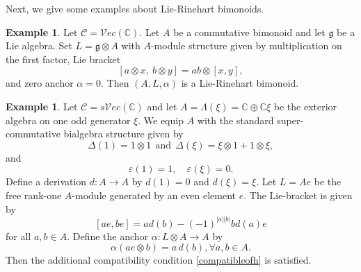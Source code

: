 \documentclass[11pt]{amsart}
\theoremstyle{definition}
\newtheorem{exam}[theo]{Example}
\numberwithin{equation}{section}
\begin{document}
Next, we give some examples about Lie-Rinehart bimonoids. 
\begin{exam}
Let $\mathcal C=\mathcal{V}ec(\mathbb C)$. Let $A$ be a commutative bimonoid and let $\mathfrak g$ be a Lie
algebra. Set $L=\mathfrak g \otimes A$ with $A$-module structure given by multiplication on the first factor, Lie bracket
\[
	[a\otimes x,\ b\otimes y]=ab\otimes [x,y],
\]
and zero anchor $\alpha=0$. Then $(A,L,\alpha)$ is a Lie-Rinehart bimonoid.
\end{exam}

\begin{exam}
Let $\mathcal C=s\mathcal{V}ec(\mathbb C)$ and let
$A=\Lambda(\xi)=\mathbb C\oplus \mathbb C\xi$
be the exterior algebra on one odd generator $\xi$. 
We equip $A$ with the standard super-commutative bialgebra structure given by
\[
\Delta(1)=1\otimes 1 \ \ \text{and} \ \ 
\Delta(\xi)=\xi\otimes 1+1\otimes \xi,
\]
and
\[
	\varepsilon(1)=1,
	\quad
	\varepsilon(\xi)=0.
\]	
Define a derivation $d:A\longrightarrow A$ by $d(1)=0$ and $d(\xi)=\xi.$
Let $L=Ae$ be the free rank-one $A$-module generated by an even element $e$. The Lie-bracket is given by 
\[[ae,be]=ad(b)-(-1)^{|a||b|}bd(a)e   \]
for all $a,b\in A.$ Define the anchor $\alpha:L\otimes A\longrightarrow A$ by
\[
	\alpha(ae\otimes b)=a\,d(b),
	\forall a,b\in A.
\]
Then the additional compatibility condition \eqref{compatibleofh} is satisfied.
\end{exam}
\end{document}
